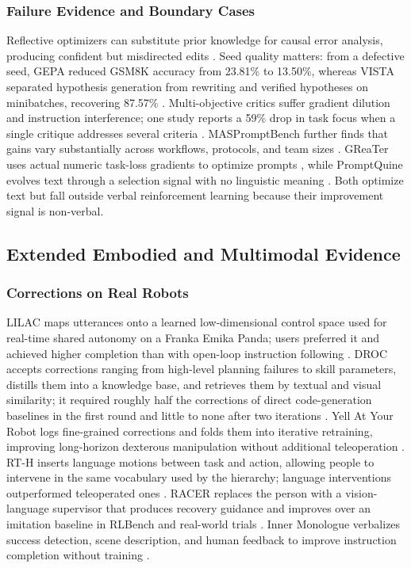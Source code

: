 \subsubsection{Failure Evidence and Boundary Cases}
\label{supp:optimizer-failures}

Reflective optimizers can substitute prior knowledge for causal error analysis, producing confident but misdirected edits \citep{ma2024are}. Seed quality matters: from a defective seed, GEPA reduced GSM8K accuracy from 23.81\% to 13.50\%, whereas VISTA separated hypothesis generation from rewriting and verified hypotheses on minibatches, recovering 87.57\% \citep{liu2026reflection}. Multi-objective critics suffer gradient dilution and instruction interference; one study reports a 59\% drop in task focus when a single critique addresses several criteria \citep{darshan2026when}. MASPromptBench further finds that gains vary substantially across workflows, protocols, and team sizes \citep{bai2026maspromptbench}. GReaTer uses actual numeric task-loss gradients to optimize prompts \citep{das2024greater}, while PromptQuine evolves text through a selection signal with no linguistic meaning \citep{wang2025evolving}. Both optimize text but fall outside verbal reinforcement learning because their improvement signal is non-verbal.

\subsection{Extended Embodied and Multimodal Evidence}
\label{supp:embodied-evidence}

\subsubsection{Corrections on Real Robots}
\label{supp:embodied-corrections}

LILAC maps utterances onto a learned low-dimensional control space used for real-time shared autonomy on a Franka Emika Panda; users preferred it and achieved higher completion than with open-loop instruction following \citep{cui2023no}. DROC accepts corrections ranging from high-level planning failures to skill parameters, distills them into a knowledge base, and retrieves them by textual and visual similarity; it required roughly half the corrections of direct code-generation baselines in the first round and little to none after two iterations \citep{zha2023distilling}. Yell At Your Robot logs fine-grained corrections and folds them into iterative retraining, improving long-horizon dexterous manipulation without additional teleoperation \citep{shi2024yell}. RT-H inserts language motions between task and action, allowing people to intervene in the same vocabulary used by the hierarchy; language interventions outperformed teleoperated ones \citep{belkhale2024rth}. RACER replaces the person with a vision-language supervisor that produces recovery guidance and improves over an imitation baseline in RLBench and real-world trials \citep{dai2024racer}. Inner Monologue verbalizes success detection, scene description, and human feedback to improve instruction completion without training \citep{huang2022inner}.

